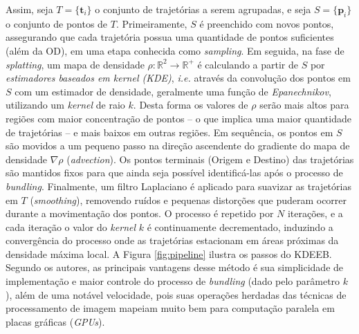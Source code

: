 Assim, seja $T = \{\mathbf{t}_i\}$ o conjunto de trajetórias a serem agrupadas,
e seja $S = \{\mathbf{p}_i\}$ o conjunto de pontos de $T$. Primeiramente, $S$
é preenchido com novos pontos, assegurando que
cada trajetória possua uma quantidade de pontos suficientes (além da OD), em uma
etapa conhecida como \emph{sampling}. Em seguida, na fase de \emph{splatting}, um mapa de
densidade $\rho :\mathbb{R}^2 \rightarrow \mathbb{R}^{+}$ é calculando a partir
de $S$ por \emph{estimadores baseados em kernel (KDE)}, \emph{i.e.} através da
convolução dos pontos em $S$ com um estimador de densidade, geralmente uma
função de \emph{Epanechnikov}, utilizando um \emph{kernel} de raio $k$. Desta
forma os valores de $\rho$ serão mais altos para regiões com maior concentração
de pontos -- o que implica uma maior quantidade de trajetórias -- e mais baixos em
outras regiões. Em sequência, os pontos em $S$ são movidos a um pequeno passo na
direção ascendente do gradiente do mapa de densidade $\nabla\rho$
(\emph{advection}). Os pontos terminais (Origem e Destino) das trajetórias são
mantidos fixos para que ainda seja possível identificá-las após o processo de
\emph{bundling}. Finalmente, um filtro Laplaciano é aplicado para suavizar as
trajetórias em $T$ (\emph{smoothing}), removendo ruídos e pequenas distorções
que puderam ocorrer durante a movimentação dos pontos. O processo é repetido por
$N$ iterações, e a cada iteração o valor do \emph{kernel} $k$ é continuamente
decrementado, induzindo a convergência do processo onde as trajetórias
estacionam em áreas próximas da densidade máxima local. A Figura \ref{fig:pipeline}
ilustra os passos do KDEEB. Segundo os autores, as
principais vantagens desse método é sua simplicidade de implementação e maior
controle do processo de \emph{bundling} (dado pelo parâmetro $k$), além de uma
notável velocidade, pois suas operações herdadas das técnicas de processamento
de imagem mapeiam muito bem para computação paralela em placas gráficas (\emph{GPUs}).

